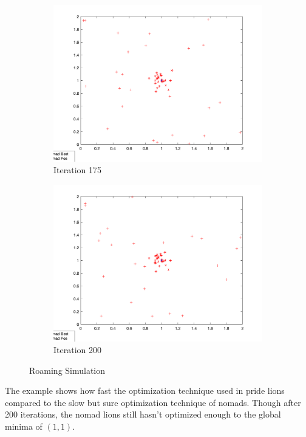 \begin{figure}
\begin{subfigure}[b]{0.4\textwidth}
    \includegraphics[width=\textwidth]{img/roam/roam-iter-175}
    \caption{Iteration 175}
    \label{fig:roam-iter-6}
  \end{subfigure}
  \begin{subfigure}[b]{0.4\textwidth}
    \includegraphics[width=\textwidth]{img/roam/roam-iter-200}
    \caption{Iteration 200}
    \label{fig:roam-iter-7}
  \end{subfigure}
  \caption{Roaming Simulation}
\end{figure}

The example shows how fast the optimization technique used in pride lions compared to the slow but sure optimization technique of nomads. Though after 200 iterations, the nomad lions still hasn't optimized enough to the global minima of $(1,1)$.

